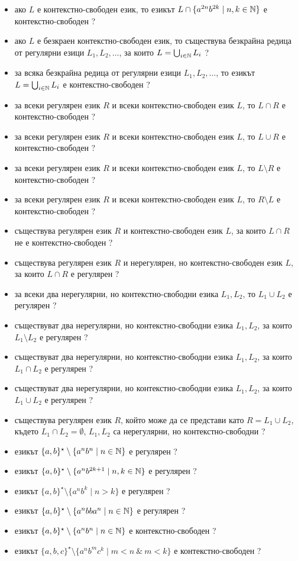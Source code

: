 \begin{itemize}
\item
  ако $L$ е контекстно-свободен език, то езикът $L \cap \{a^{2n}b^{2k}\mid n,k\in\mathbb{N}\}$ е контекстно-свободен ?
\item
  ако $L$ е безкраен контекстно-свободен език, то съществува безкрайна редица от регулярни езици $L_1,L_2,\dots$,
  за които $L = \bigcup_{i\in\mathbb{N}}L_i$ ?
\item
  за всяка безкрайна редица от регулярни езици $L_1,L_2,\dots$, то 
  езикът $L = \bigcup_{i\in\mathbb{N}}L_i$ е контекстно-свободен ?
\item
  за всеки регулярен език $R$ и всеки контекстно-свободен език $L$, то $L \cap R$ е контекстно-свободен ?
\item
  за всеки регулярен език $R$ и всеки контекстно-свободен език $L$, то $L \cup R$ е контекстно-свободен ?
\item
  за всеки регулярен език $R$ и всеки контекстно-свободен език $L$, то $L \setminus R$ е контекстно-свободен ?
\item
  за всеки регулярен език $R$ и всеки контекстно-свободен език $L$, то $R \setminus L$ е контекстно-свободен ?
\item
  съществува регулярен език $R$ и контекстно-свободен език $L$, за които $L \cap R$ не е контекстно-свободен ?
\item
  съществува регулярен език $R$ и нерегулярен, но контекстно-свободен език $L$, за които $L \cap R$ е регулярен ?
\item
  за всеки два нерегулярни, но контекстно-свободни езика $L_1,L_2$, то $L_1\cup L_2$ е регулярен ?
\item
  съществуват два нерегулярни, но контекстно-свободни езика $L_1,L_2$, за които $L_1\setminus L_2$ е регулярен ?
\item
  съществуват два нерегулярни, но контекстно-свободни езика $L_1,L_2$, за които $L_1\cap L_2$ е регулярен ?
\item
  съществуват два нерегулярни, но контекстно-свободни езика $L_1,L_2$, за които $L_1\cup L_2$ е регулярен ?
\item
  съществува регулярен език $R$, който може да се представи като $R = L_1 \cup L_2$, където
  $L_1 \cap L_2 = \emptyset$, $L_1,L_2$ са нерегулярни, но контекстно-свободни ?
\item
  езикът $\{a,b\}^\star \setminus \{a^nb^n \mid n\in\mathbb{N}\}$ е регулярен ?
\item
  езикът $\{a,b\}^\star \setminus \{a^nb^{2k+1} \mid n,k\in\mathbb{N}\}$ е регулярен ?
\item
  езикът $\{a,b\}^\star \setminus \{a^nb^{k} \mid n > k\}$ е регулярен ?
\item
  езикът $\{a,b\}^\star \setminus \{a^nbba^{n} \mid n \in \mathbb{N}\}$ е регулярен ?
\item
  езикът $\{a,b\}^\star \setminus \{a^nb^n \mid n\in\mathbb{N}\}$ е контекстно-свободен ?
\item
  езикът $\{a,b,c\}^\star \setminus \{a^nb^mc^k \mid m < n\ \&\ m < k\}$ е контекстно-свободен ?
\end{itemize}

